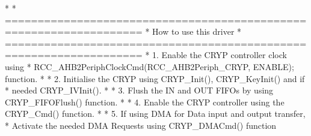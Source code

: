 \begin{DoxyVerb}*                               
*          ===================================================================      
*                                 How to use this driver
*          =================================================================== 
*          1. Enable the CRYP controller clock using 
*              RCC_AHB2PeriphClockCmd(RCC_AHB2Periph_CRYP, ENABLE); function.
*
*          2. Initialise the CRYP using CRYP_Init(), CRYP_KeyInit() and if 
*             needed CRYP_IVInit(). 
*
*          3. Flush the IN and OUT FIFOs by using CRYP_FIFOFlush() function.
*
*          4. Enable the CRYP controller using the CRYP_Cmd() function. 
*
*          5. If using DMA for Data input and output transfer, 
*             Activate the needed DMA Requests using CRYP_DMACmd() function 


\end{DoxyVerb}
